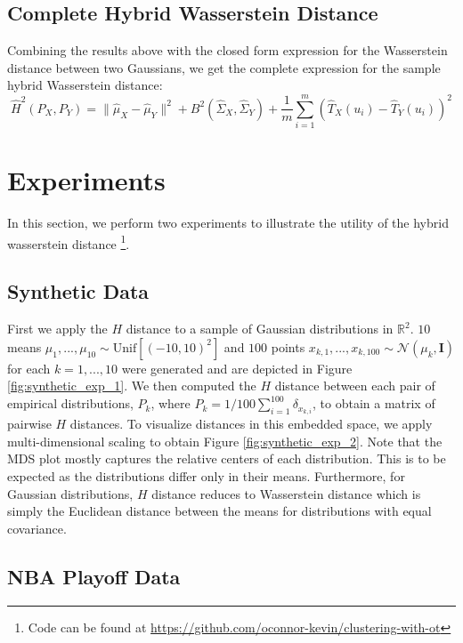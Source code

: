 \documentclass[11pt, a4paper, fleqn]{article}
\numberwithin{equation}{section}
\numberwithin{figure}{section}
\numberwithin{table}{section}
\begin{document}
\subsection{Complete Hybrid Wasserstein Distance}
Combining the results above with the closed form expression for the Wasserstein distance between two Gaussians, we get the complete expression for the sample hybrid Wasserstein distance:
\begin{equation}
\hat{H}^2(P_X, P_Y) = \| \hat{\mu}_X - \hat{\mu}_Y\|^2 + B^2(\hat{\Sigma}_X, \hat{\Sigma}_Y) + \frac{1}{m} \sum\limits_{i=1}^m (\hat{T}_X(u_i) - \hat{T}_Y(u_i))^2
\end{equation}


\section{Experiments}\label{sec:experiments}
In this section, we perform two experiments to illustrate the utility of the hybrid wasserstein distance \footnote{Code can be found at \url{https://github.com/oconnor-kevin/clustering-with-ot}}.
\subsection{Synthetic Data}
First we apply the $H$ distance to a sample of Gaussian distributions in $\mathbb{R}^2$. $10$ means $\mu_1, ..., \mu_{10} \sim \mbox{Unif}[(-10, 10)^2]$ and $100$ points $x_{k,1}, ..., x_{k,100} \sim \mathcal{N}(\mu_k, \mathbf{I})$ for each $k = 1, ..., 10$ were generated and are depicted in Figure \ref{fig:synthetic_exp_1}. We then computed the $H$ distance between each pair of empirical distributions, $P_k$, where $P_k = 1/100  \sum_{i=1}^{100} \delta_{x_{k, i}}$, to obtain a matrix of pairwise $H$ distances. To visualize distances in this embedded space, we apply multi-dimensional scaling to obtain Figure \ref{fig:synthetic_exp_2}.  Note that the MDS plot mostly captures the relative centers of each distribution. This is to be expected as the distributions differ only in their means. Furthermore, for Gaussian distributions, $H$ distance reduces to Wasserstein distance which is simply the Euclidean distance between the means for distributions with equal covariance.

\subsection{NBA Playoff Data}
\end{document}
